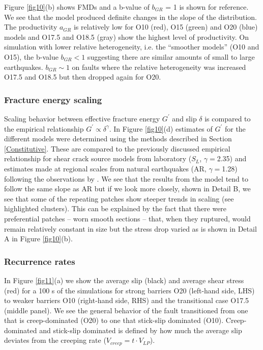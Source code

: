 \documentclass[preprint,1p, 10pt,authoryear]{elsarticle}
\begin{document}
Figure \ref{fig10}(b) shows FMDs and a b-value of $b_{GR}$ = 1 is shown for reference. We see that the model produced definite changes in the slope of the distribution.  The productivity $a_{GR}$  is relatively low for O10 (red), O15 (green) and O20 (blue) models and O17.5 and O18.5 (gray) show the highest level of productivity. On simulation with lower relative heterogeneity, i.e. the ``smoother models'' (O10 and O15), the b-value $b_{GR} < 1$ suggesting there are similar amounts of small to large earthquakes.  $b_{GR} \sim 1$ on faults where the relative heterogeneity was increased O17.5 and O18.5 but then dropped again for O20.

\subsubsection{Fracture energy scaling}
Scaling behavior between effective fracture energy $G^{'}$ and slip $\delta$  is compared to the  empirical relationship $G^{'} \propto \delta^{\gamma}$. In Figure \ref{fig10}(d) estimates of $G^{'}$ for the different models were determined using the methods described in Section \ref{Constitutive}. These are compared to the previously discussed empirical relationship for shear crack source models from laboratory ($S_{L}$, $\gamma = $2.35) \citep{Selvadurai2019}  and estimates made at regional scales from natural earthquakes (AR, $\gamma = $1.28) following the observations by \citet{Abercrombie2005}.  We see that the results from the model tend to follow the same slope as AR but if we look more closely, shown in Detail B, we see that some of the repeating patches show steeper trends in scaling (see highlighted clusters). This can be explained by the fact that there were preferential patches -- worn smooth sections -- that, when they ruptured, would remain relatively constant in size but the stress drop varied as is shown in Detail A in Figure \ref{fig10}(b).

\subsubsection{Recurrence rates}
\label{Recurrence times}
In Figure \ref{fig11}(a) we show the average slip (black) and average shear stress (red) for a 100 s of the simulations for strong barriers O20 (left-hand side, LHS) to weaker barriers O10 (right-hand side, RHS) and the transitional case O17.5 (middle panel).  We see the general behavior of the fault transitioned from one that is creep-dominated (O20) to one that stick-slip dominated (O10). Creep-dominated and stick-slip dominated is defined by how much the average slip deviates from the creeping rate ($V_{creep} = t\cdot V_{LP}$). 
\end{document}
